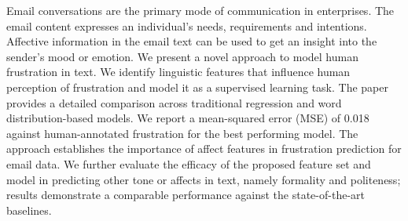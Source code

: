 Email conversations are the primary mode of communication in enterprises. The email content expresses an individual's needs, requirements and intentions. Affective information in the email text can be used to get an insight into the sender's mood or emotion. We present a novel approach to model human frustration in text. We identify linguistic features that influence human perception of frustration and model it as a supervised learning task. The paper provides a detailed comparison across traditional regression and word distribution-based models. We report a mean-squared error (MSE) of 0.018 against human-annotated frustration for the best performing model. The approach establishes the importance of affect features in frustration prediction for email data. We further evaluate the efficacy of the proposed feature set and model in predicting other tone or affects in text, namely formality and politeness; results demonstrate a comparable performance against the state-of-the-art baselines.

